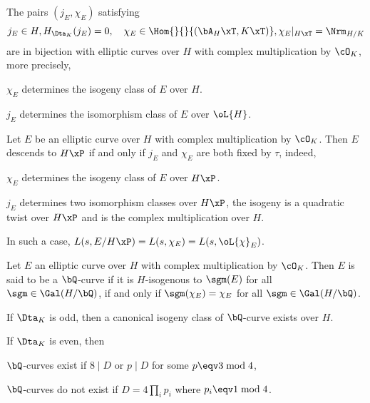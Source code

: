 \documentclass[article, a4paper, twoside]{universal}
\begin{document}
\begin{thm}
	The pairs $(j_{E},\chi_{E})$ satisfying
	\[
		j_{E}\in H, H_{\Dta_{K}}(j_{E})=0,\quad \chi_{E}\in\Hom{}{}{(\bA_{H}\xT,K\xT)}, \chi_{E}|_{H\xT}=\Nrm_{H/K}
	\]
	are in bijection with elliptic curves over $H$ with complex multiplication by $\cO_{K}$, more precisely,
	\begin{itm}
		\item $\chi_{E}$ determines the isogeny class of $E$ over $H$.
		\item $j_{E}$ determines the isomorphism class of $E$ over $\oL{H}$.
	\end{itm}
\end{thm}

\begin{thm}
	Let $E$ be an elliptic curve over $H$ with complex multiplication by $\cO_{K}$. Then $E$ descends to $H\xP$ if and only if $j_{E}$ and $\chi_{E}$ are both fixed by $\tau$, indeed,
	\begin{itm}
		\item $\chi_{E}$ determines the isogeny class of $E$ over $H\xP$.
		\item $j_{E}$ determines two isomorphism classes over $H\xP$, the isogeny is a quadratic twist over $H\xP$ and is the complex multiplication over $H$.
	\end{itm}
	In such a case, $L(s,E/H\xP)=L(s,\chi_{E})=L(s,\oL{\chi}_{E})$.
\end{thm}

\begin{thm}
	Let $E$ an elliptic curve over $H$ with complex multiplication by $\cO_{K}$. Then $E$ is said to be a $\bQ$-curve if it is $H$-isogenous to $\sgm(E)$ for all $\sgm\in\Gal(H/\bQ)$, if and only if $\sgm(\chi_{E})=\chi_{E}$ for all $\sgm\in\Gal(H/\bQ)$.
	\begin{itm}
		\item If $\Dta_{K}$ is odd, then a canonical isogeny class of $\bQ$-curve exists over $H$.
		\item If $\Dta_{K}$ is even, then
		\begin{itm}
			\item $\bQ$-curves exist if $8\mid D$ or $p\mid D$ for some $p\eqv3\bmod{4}$,
			\item $\bQ$-curves do not exist if $D=4\prod_{i}p_{i}$ where $p_{i}\eqv1\bmod{4}$.
		\end{itm}
	\end{itm}
\end{thm}
\end{document}
